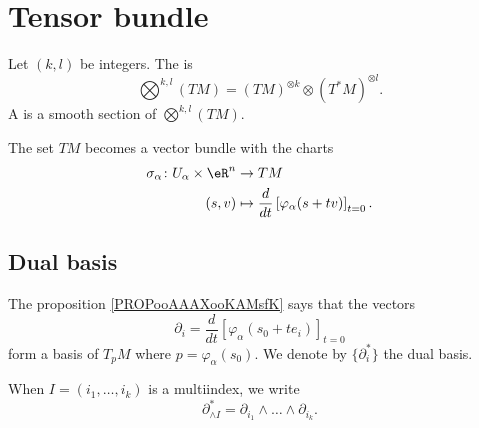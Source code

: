 \section{Tensor bundle}

\begin{definition}
	Let \( (k,l)\) be integers. The  is
	\begin{equation}
		\bigotimes^{k,l}(TM)=(TM)^{\otimes k}\otimes (T^*M)^{\otimes l}.
	\end{equation}
	A  is a smooth section of \( \bigotimes^{k,l}(TM)\).
\end{definition}

\begin{proposition}		\label{PROPooIMOJooKzEDXA}
	The set \( TM\) becomes a vector bundle with the charts
	\begin{equation}
		\begin{aligned}
			\sigma_{\alpha}\colon U_{\alpha}\times \eR^n & \to TM                                                              \\
			(s,v)                                        & \mapsto  \frac{d}{dt} \left[ \varphi_{\alpha}(s+tv)  \right]_{t=0}.
		\end{aligned}
	\end{equation}
\end{proposition}

\noproof


\subsection{Dual basis}


The proposition \ref{PROPooAAAXooKAMsfK} says that the vectors
\begin{equation}
	\partial_i=\frac{d}{dt} \left[ \varphi_{\alpha}(s_0+te_i)  \right]_{t=0}
\end{equation}
form a basis of \( T_pM\) where \( p=\varphi_{\alpha}(s_0)\). We denote by \( \{ \partial_{i}^* \}\) the dual basis.

\begin{normaltext}
	When \( I=(i_1,\ldots,i_k)\) is a multiindex, we write
	\begin{equation}
		\partial^*_{\wedge I}=\partial_{i_1}\wedge\ldots\wedge\partial_{i_k}.
	\end{equation}
\end{normaltext}

